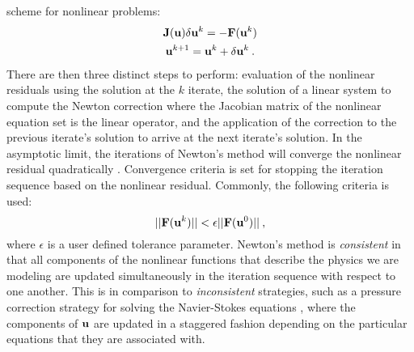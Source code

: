scheme for nonlinear problems:
\begin{subequations}
  \begin{gather}
    \mathbf{J}(\mathbf{u}) \delta \mathbf{u}^k = -\mathbf{F}(\mathbf{u}^{k})\\
    \mathbf{u}^{k+1} = \mathbf{u}^k + \delta \mathbf{u}^k\:.
  \end{gather}
  \label{eq:newton_iteration}
\end{subequations}
There are then three distinct steps to perform: evaluation of the
nonlinear residuals using the solution at the $k$ iterate, the
solution of a linear system to compute the Newton correction where the
Jacobian matrix of the nonlinear equation set is the linear operator,
and the application of the correction to the previous iterate's
solution to arrive at the next iterate's solution. In the asymptotic
limit, the iterations of Newton's method will converge the nonlinear
residual quadratically \citep{kelley_iterative_1995}. Convergence
criteria is set for stopping the iteration sequence based on the
nonlinear residual. Commonly, the following criteria is used:
\begin{equation}
  ||\mathbf{F}(\mathbf{u}^{k})|| < \epsilon ||\mathbf{F}(\mathbf{u}^{0})||\:,
  \label{eq:newton_stopping_criteria}
\end{equation}
where $\epsilon$ is a user defined tolerance parameter. Newton's
method is \textit{consistent} in that all components of the nonlinear
functions that describe the physics we are modeling are updated
simultaneously in the iteration sequence with respect to one
another. This is in comparison to \textit{inconsistent} strategies,
such as a pressure correction strategy for solving the Navier-Stokes
equations \citep{pletcher_computational_1997}, where the components of
$\mathbf{u}$ are updated in a staggered fashion depending on the
particular equations that they are associated with.


